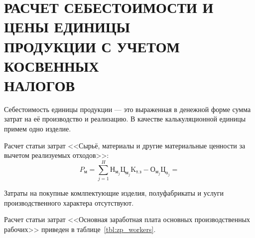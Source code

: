 \section[
Расчет себестоимости и цены единицы продукции с учетом \\
косвенных налогов
]{
РАСЧЕТ СЕБЕСТОИМОСТИ И ЦЕНЫ ЕДИНИЦЫ \\
ПРОДУКЦИИ С УЧЕТОМ КОСВЕННЫХ \\
НАЛОГОВ
}
\label{sec:cost}

Себестоимость единицы продукции --- это выраженная в денежной форме
сумма затрат на её производство и реализацию.
В качестве калькуляционной единицы примем одно изделие.

Расчет статьи затрат 
<<Сырьё, материалы и другие материальные ценности
за вычетом реализуемых отходов>>:
\begin{equation*}
P_{\text{м}} = 
\sum^{H}_{j=1} \text{Н}_{\text{м}_j} \text{Ц}_{\text{м}_j} \text{K}_{\text{т.з}} 
- \text{О}_{\text{м}_j} \text{Ц}_{\text{о}_j} =
\end{equation*}

Затраты на покупные комлпектующие изделия, 
полуфабрикаты и услуги производственного характера отсутствуют.

Расчет статьи затрат
<<Основная заработная плата основных производственных рабочих>>
приведен в таблице~\ref{tbl:zp_workers}.

